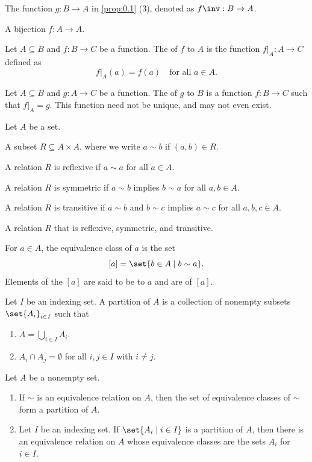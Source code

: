  The function $g : B \to A$ in \cref{prop:0.1} (3), denoted as $f\inv : B \to A$.

 A bijection $f : A \to A$.

 Let $A \subseteq B$ and $f : B \to C$ be a function.
The  of $f$ to $A$ is the function $f|_A : A \to C$ defined as
\[
    f|_A(a) = f(a) \quad \text{for all } a \in A.
\]

 Let $A \subseteq B$ and $g : A \to C$ be a function.
The  of $g$ to $B$ is a function $f : B \to C$ such that $f|_A = g$.
This function need not be unique, and may not even exist.

\begin{groupdef}
    Let $A$ be a set.

     A subset $R \subseteq A \times A$, where we write $a \sim b$ if $(a, b) \in R$.
    
     A relation $R$ is reflexive if $a \sim a$ for all $a \in A$.

     A relation $R$ is symmetric if $a \sim b$ implies $b \sim a$ for all $a, b \in A$.

     A relation $R$ is transitive if $a \sim b$ and $b \sim c$ implies $a \sim c$ for all $a, b, c \in A$.

     A relation $R$ that is reflexive, symmetric, and transitive.

     For $a \in A$, the equivalence class of $a$ is the set
    \[
        [a] = \set{b \in A \mid b \sim a}.
    \]
    Elements of the $[a]$ are said to be  to $a$ and are  of $[a]$.

     Let $I$ be an indexing set. A partition of $A$ is a collection of nonempty subsets $\set{A_i}_{i \in I}$ such that
    \begin{enumerate}
        \item $A = \bigcup_{i \in I} A_i$.
        \item $A_i \cap A_j = \emptyset$ for all $i, j \in I$ with $i \neq j$.
    \end{enumerate}
\end{groupdef}

\begin{proposition}
    Let $A$ be a nonempty set.
    \begin{enumerate}
        \item If $\sim$ is an equivalence relation on $A$, then the set of equivalence classes of $\sim$ form a partition of $A$.
        \item Let $I$ be an indexing set. If $\set{A_i \mid i \in I}$ is a partition of $A$, then there is an equivalence relation on $A$ whose equivalence classes are the sets $A_i$ for $i \in I$.
    \end{enumerate}
\end{proposition}

